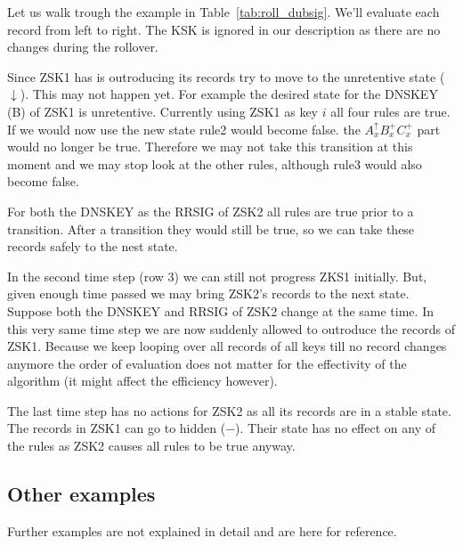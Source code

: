\documentclass[twoside, a4paper]{article}
\begin{document}
Let us walk trough the example in Table~\ref{tab:roll_dubsig}. We'll 
evaluate each record from left to right. The KSK is ignored in our 
description as there are no changes during the rollover.

Since ZSK1 has is outroducing its records try to move to the 
unretentive state ($\downarrow$). This may not happen yet. For 
example the desired state for the DNSKEY (B) of ZSK1 is unretentive. 
Currently using ZSK1 as key $i$ all four rules are true. If we would 
now use the new state rule2 would become false.  the 
$A_{x}^{\uparrow}B_{x}^{+} C_{x}^{+}$ part would no longer be true.
Therefore we may not take this transition at this moment and we may
stop look at the other rules, although rule3 would also become false.

For both the DNSKEY as the RRSIG of ZSK2 all rules are true prior to 
a transition. After a transition they would still be true, so we can 
take these records safely to the nest state.

In the second time step (row 3) we can still not progress ZKS1 
initially. But, given enough time passed we may bring ZSK2's records 
to the next state. Suppose both the DNSKEY and RRSIG of ZSK2 change 
at the same time. In this very same time step we are now suddenly 
allowed to outroduce the records of ZSK1. Because we keep looping 
over all records of all keys till no record changes anymore the 
order of evaluation does not matter for the effectivity of the 
algorithm (it might affect the efficiency however).

The last time step has no actions for ZSK2 as all its records are in a stable
state. The records in ZSK1 can go to hidden ($-$). Their state has no effect
on any of the rules as ZSK2 causes all rules to be true anyway.

\subsection{Other examples}

Further examples are not explained in detail and are here for reference.
\end{document}
